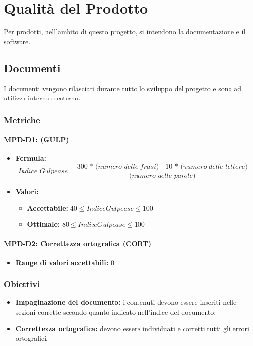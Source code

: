 \section{Qualità del Prodotto} \label{_qualitaProdotto}
Per prodotti, nell'ambito di questo progetto, si intendono la documentazione e il software.

\subsection{Documenti}\label{_documenti}
I documenti vengono rilasciati durante tutto lo sviluppo del progetto e sono ad utilizzo interno o esterno.

\subsubsection{Metriche}

\paragraph{MPD-D1:  (GULP)}
\begin{itemize}
    \item \textbf{Formula:} \[\textit{Indice Gulpease} = \frac{\textit{300 * (numero delle frasi) - 10 * (numero delle lettere)}}{\textit{(numero delle parole)}}\]
    \item \textbf{Valori:}
          \begin{itemize}
              \item \textbf{Accettabile:} $40 \leq Indice Gulpease \leq 100$
              \item \textbf{Ottimale:} $80 \leq Indice Gulpease \leq 100$
          \end{itemize}
\end{itemize}

\paragraph{MPD-D2: Correttezza ortografica (CORT)}
\begin{itemize}
    \item  \textbf{Range di valori accettabili:} 0
\end{itemize}

\subsubsection{Obiettivi}
\begin{itemize}
    \item \textbf{Impaginazione del documento:} i contenuti devono essere inseriti nelle sezioni corrette secondo quanto indicato nell'indice del documento;
    \item \textbf{Correttezza ortografica:} devono essere individuati e corretti tutti gli errori ortografici.
\end{itemize}

